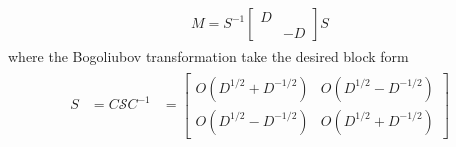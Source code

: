 \begin{eqnarray}\begin{aligned}
M=S^{-1}
\begin{bmatrix}
D \\
& -D
\end{bmatrix}
S
\end{aligned}\end{eqnarray}
where the Bogoliubov transformation take the desired block form
\begin{eqnarray}\begin{aligned}
S&=C\mathcal{S}C^{-1}
&=\begin{bmatrix}
O(D^{1/2}+D^{-1/2}) & O(D^{1/2}-D^{-1/2}) \\
O(D^{1/2}-D^{-1/2}) & O(D^{1/2}+D^{-1/2}) 
\end{bmatrix}
\end{aligned}\end{eqnarray}


